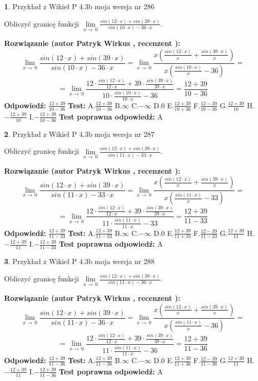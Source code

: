 \documentclass[12pt, a4paper]{article}
\theoremstyle{definition} %
\newtheorem{zad}{}
\newcommand{\zadStart}[1]{\begin{zad}#1\newline}
\newcommand{\zadStop}{\end{zad}}
\newcommand{\rozwStart}[2]{\noindent \textbf{Rozwiązanie (autor #1 , recenzent #2): }\newline}
\newcommand{\rozwStop}{\newline}
\newcommand{\odpStart}{\noindent \textbf{Odpowiedź:}\newline}
\newcommand{\odpStop}{\newline}
\newcommand{\testStart}{\noindent \textbf{Test:}\newline}
\newcommand{\testStop}{\newline}
\newcommand{\kluczStart}{\noindent \textbf{Test poprawna odpowiedź:}\newline}
\newcommand{\kluczStop}{\newline}
\begin{document}
\zadStart{Przykład z Wikieł P 4.3b moja wersja nr 286}


Obliczyć granicę funkcji $\lim\limits_{x\to\ 0}\frac{sin(12 \cdot x)+sin(39 \cdot x)}{sin(10 \cdot x)-36 \cdot x}$.
\zadStop
\rozwStart{Patryk Wirkus}{}
$$\lim\limits_{x\to\ 0}\frac{sin(12 \cdot x)+sin(39 \cdot x)}{sin(10 \cdot x)-36 \cdot x}=\lim\limits_{x\to\ 0}\frac{x(\frac{sin(12 \cdot x)}{x}+\frac{sin(39 \cdot x)}{x})}{x(\frac{sin(10 \cdot x)}{x}-36)}=$$
$$=\lim\limits_{x\to\ 0}\frac{12 \cdot \frac{sin(12 \cdot x)}{12 \cdot x}+39 \cdot \frac{sin(39 \cdot x)}{39 \cdot x}}{10 \cdot \frac{sin(10 \cdot x)}{10 \cdot x}-36}=\frac{12+39}{10-36}$$
\rozwStop
\odpStart
$\frac{12+39}{10-36}$
\odpStop
\testStart
A.$\frac{12+39}{10-36}$
B.$\infty$
C.$-\infty$
D.$0$
E.$\frac{12+39}{10+36}$
F.$\frac{12-39}{10-36}$
G.$\frac{12+39}{10}$
H.$-\frac{12+39}{10}$
I.$-\frac{12+39}{10-36}$
\testStop
\kluczStart
A
\kluczStop



\zadStart{Przykład z Wikieł P 4.3b moja wersja nr 287}


Obliczyć granicę funkcji $\lim\limits_{x\to\ 0}\frac{sin(12 \cdot x)+sin(39 \cdot x)}{sin(11 \cdot x)-33 \cdot x}$.
\zadStop
\rozwStart{Patryk Wirkus}{}
$$\lim\limits_{x\to\ 0}\frac{sin(12 \cdot x)+sin(39 \cdot x)}{sin(11 \cdot x)-33 \cdot x}=\lim\limits_{x\to\ 0}\frac{x(\frac{sin(12 \cdot x)}{x}+\frac{sin(39 \cdot x)}{x})}{x(\frac{sin(11 \cdot x)}{x}-33)}=$$
$$=\lim\limits_{x\to\ 0}\frac{12 \cdot \frac{sin(12 \cdot x)}{12 \cdot x}+39 \cdot \frac{sin(39 \cdot x)}{39 \cdot x}}{11 \cdot \frac{sin(11 \cdot x)}{11 \cdot x}-33}=\frac{12+39}{11-33}$$
\rozwStop
\odpStart
$\frac{12+39}{11-33}$
\odpStop
\testStart
A.$\frac{12+39}{11-33}$
B.$\infty$
C.$-\infty$
D.$0$
E.$\frac{12+39}{11+33}$
F.$\frac{12-39}{11-33}$
G.$\frac{12+39}{11}$
H.$-\frac{12+39}{11}$
I.$-\frac{12+39}{11-33}$
\testStop
\kluczStart
A
\kluczStop



\zadStart{Przykład z Wikieł P 4.3b moja wersja nr 288}


Obliczyć granicę funkcji $\lim\limits_{x\to\ 0}\frac{sin(12 \cdot x)+sin(39 \cdot x)}{sin(11 \cdot x)-36 \cdot x}$.
\zadStop
\rozwStart{Patryk Wirkus}{}
$$\lim\limits_{x\to\ 0}\frac{sin(12 \cdot x)+sin(39 \cdot x)}{sin(11 \cdot x)-36 \cdot x}=\lim\limits_{x\to\ 0}\frac{x(\frac{sin(12 \cdot x)}{x}+\frac{sin(39 \cdot x)}{x})}{x(\frac{sin(11 \cdot x)}{x}-36)}=$$
$$=\lim\limits_{x\to\ 0}\frac{12 \cdot \frac{sin(12 \cdot x)}{12 \cdot x}+39 \cdot \frac{sin(39 \cdot x)}{39 \cdot x}}{11 \cdot \frac{sin(11 \cdot x)}{11 \cdot x}-36}=\frac{12+39}{11-36}$$
\rozwStop
\odpStart
$\frac{12+39}{11-36}$
\odpStop
\testStart
A.$\frac{12+39}{11-36}$
B.$\infty$
C.$-\infty$
D.$0$
E.$\frac{12+39}{11+36}$
F.$\frac{12-39}{11-36}$
G.$\frac{12+39}{11}$
H.$-\frac{12+39}{11}$
I.$-\frac{12+39}{11-36}$
\testStop
\kluczStart
A
\kluczStop
\end{document}
